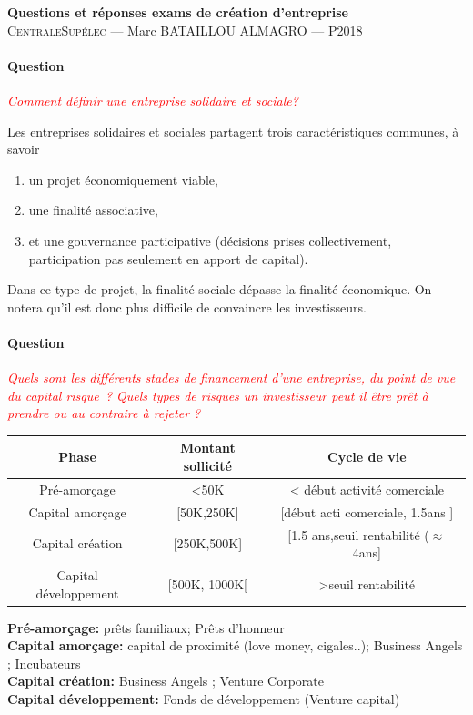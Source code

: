 \documentclass[12pt,oneside,a4paper]{article}
\newcommand{\question}[1]
{
\addtocounter{section}{1}
\paragraph*{Question \thesection}
\emph{\textcolor{red}{#1}}
}
\begin{document}
\begin{center}
{\LARGE \bfseries 
 Questions et réponses exams de création d'entreprise \\[0.3cm] 
}
{\large
  \textsc{CentraleSupélec} --- Marc BATAILLOU ALMAGRO --- P2018\\[0.7cm]
}
\end{center}
\question{Comment définir une entreprise solidaire et sociale?}
Les entreprises solidaires et sociales partagent trois caractéristiques communes, à savoir
\begin{enumerate}
  \item un projet économiquement viable,
  \item une finalité associative,
  \item et une gouvernance participative (décisions prises collectivement, participation pas seulement en apport de capital).
\end{enumerate}
Dans ce type de projet, la finalité sociale dépasse la finalité économique.
On notera qu'il est donc plus difficile de convaincre les investisseurs.
  
\question{Quels sont les différents stades de financement d’une entreprise, du point de vue du capital risque ? Quels types de risques un investisseur peut il être prêt à prendre ou au contraire à rejeter ?}

\vspace{1cm}
\begin{tabular}{|c|c|c|} 
	\hline
	 Phase & Montant sollicité & Cycle de vie\\
	 \hline
	 Pré-amorçage & <50K & < début activité comerciale\\
	 \hline
	 Capital amorçage & [50K,250K] & [début acti comerciale, 1.5ans ]\\
	 \hline
	 Capital création & [250K,500K] & [1.5 ans,seuil rentabilité ($\approx$4ans]\\
	 \hline
	 Capital développement & [500K, 1000K[ & >seuil rentabilité\\
	 \hline
\end{tabular} 
\vspace{1cm}

\noindent
\textbf{Pré-amorçage:} prêts familiaux; Prêts d'honneur \\
\textbf{Capital amorçage:} capital de proximité (love money, cigales..); Business Angels ; Incubateurs\\
\textbf{Capital création: }Business Angels ; Venture Corporate\\
\textbf{Capital développement:} Fonds de développement (Venture capital)\\
\end{document}
